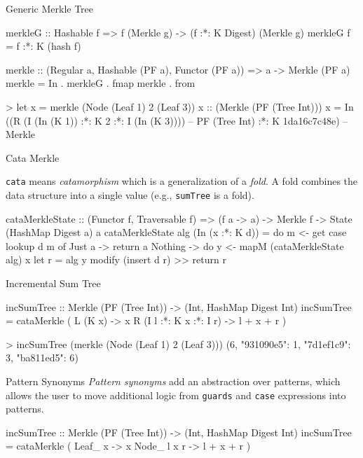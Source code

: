 \begin{slide}{Generic Merkle Tree}
\begin{haskell}
merkleG :: Hashable f => f (Merkle g) -> (f :*: K Digest) (Merkle g)
merkleG f = f :*: K (hash f)

merkle :: (Regular a, Hashable (PF a), Functor (PF a))
       => a -> Merkle (PF a)
merkle = In . merkleG . fmap merkle . from

> let x = merkle (Node (Leaf 1) 2 (Leaf 3))
    x :: (Merkle (PF (Tree Int)))
    x = In ((R (I (In (K 1)) :*: K 2 :*: I (In (K 3)))) -- PF (Tree Int)
            :*: K 1da16c7c48e)                          -- Merkle


\end{haskell}
\end{slide}

\begin{slide}{Cata Merkle}

\texttt{cata} means \textit{catamorphism} which is a generalization of a \textit{fold}. A fold combines the data structure into a single value (e.g., \texttt{sumTree} is a fold).  

\vspace*{0.4cm}
\begin{haskell}
cataMerkleState :: (Functor f, Traversable f)
                => (f a -> a) -> Merkle f -> State (HashMap Digest a) a
cataMerkleState alg (In (x :*: K d)) 
  = do m <- get
       case lookup d m of
         Just a  -> return a
         Nothing -> do y <- mapM (cataMerkleState alg) x
                       let r = alg y
                       modify (insert d r) >> return r
\end{haskell}
\end{slide}

\begin{slide}{Incremental Sum Tree}
\begin{haskell}
incSumTree :: Merkle (PF (Tree Int)) -> (Int, HashMap Digest Int)
incSumTree = cataMerkle
  (\case
    L (K x)                 -> x
    R (I l :*: K x :*: I r) -> l + x + r
  )

> incSumTree (merkle (Node (Leaf 1) 2 (Leaf 3)))
    (6, {"931090e5": 1, "7d1ef1c9": 3, "ba811ed5": 6})
\end{haskell}
\end{slide}

\begin{slide}{Pattern Synonyms}
\textit{Pattern synonyms} add an abstraction over patterns, which allows the user to move additional logic from \texttt{guards} and \texttt{case} expressions into patterns.

\vspace*{0.4cm}
\begin{haskell}
incSumTree :: Merkle (PF (Tree Int)) -> (Int, HashMap Digest Int)
incSumTree = cataMerkle
  (\case
    Leaf_ x     -> x
    Node_ l x r -> l + x + r
  )
\end{haskell}
\end{slide}


